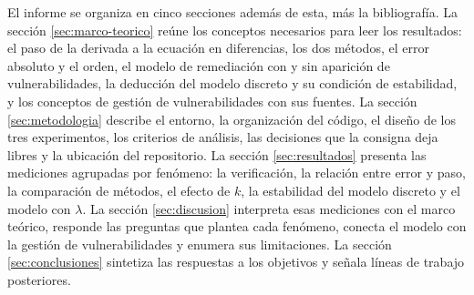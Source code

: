 El informe se organiza en cinco secciones además de esta, más la bibliografía. La sección
\ref{sec:marco-teorico} reúne los conceptos necesarios para leer los resultados: el paso de la
derivada a la ecuación en diferencias, los dos métodos, el error absoluto y el orden, el modelo
de remediación con y sin aparición de vulnerabilidades, la deducción del modelo discreto y su
condición de estabilidad, y los conceptos de gestión de vulnerabilidades con sus fuentes. La
sección \ref{sec:metodologia} describe el entorno, la organización del código, el diseño de los
tres experimentos, los criterios de análisis, las decisiones que la consigna deja libres y la
ubicación del repositorio. La sección \ref{sec:resultados} presenta las mediciones agrupadas por
fenómeno: la verificación, la relación entre error y paso, la comparación de métodos, el efecto
de $k$, la estabilidad del modelo discreto y el modelo con $\lambda$. La sección
\ref{sec:discusion} interpreta esas mediciones con el marco teórico, responde las preguntas que
plantea cada fenómeno, conecta el modelo con la gestión de vulnerabilidades y enumera sus
limitaciones. La sección \ref{sec:conclusiones} sintetiza las respuestas a los objetivos y señala
líneas de trabajo posteriores.
